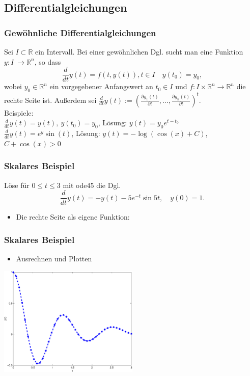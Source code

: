 \documentclass[hyperref={xetex}]{beamer}
\begin{document}
\subsection{Differentialgleichungen}
%
%
\begin{frame}[fragile]\frametitle{Gew\"ohnliche Differentialgleichungen}
Sei $I \subset \mathbb{R}$ ein Intervall. Bei einer gewöhnlichen Dgl. sucht man eine Funktion $y:I \
\longrightarrow \mathbb{R}^n$, so dass
\alert{ \[ \frac{d}{dt}y(t)=f(t,y(t)), t\in I\quad y(t_0)=y_0, \]}
wobei $y_0 \in \mathbb{R}^n$ ein vorgegebener Anfangswert an $t_0\in I$
und $f:I \times \mathbb{R}^n \longrightarrow \mathbb{R}^n$ die
rechte Seite ist. Au{\ss}erdem sei $ \frac{d}{dt}y(t) :=(\frac{\partial
  y_1(t)}{\partial t}, \dots, \frac{\partial
  y_n(t)}{\partial t})^t$. \\
\alert{Beispiele:}\\
{\scriptsize
$\frac{d}{dt} y(t) = y(t), \ y(t_0)=y_0$, \quad L\"osung:
$y(t)=y_0 e^{t-t_0}$\\
$\frac{d}{dt} y(t) = e^y \sin(t)$, \quad L\"osung: $y(t)=-\log( \cos(x)+C)$, $C+\cos(x)>0$ }
\end{frame}
%
%
\begin{frame}[fragile]\frametitle{Skalares Beispiel}
L\"ose f\"ur $0 \leq t \leq 3$ mit \alert{ ode45} die Dgl.
\alert{ \[ \frac{d}{dt} y(t) = -y(t)-5e^{-t}\sin5t, \quad y(0)=1. \]}
\begin{itemize}
\item Die rechte Seite als eigene Funktion:

\end{itemize}
\end{frame}
%
%
\begin{frame}[fragile]\frametitle{Skalares Beispiel}
\begin{itemize}
\item Ausrechnen und Plotten

\end{itemize}
\begin{center}
\includegraphics[width=0.5\textwidth]{./figures/loesung_dgl1} 
\end{center}
\end{frame}
\end{document}
